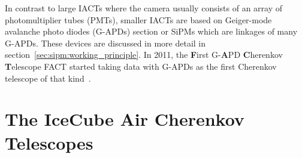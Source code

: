 In contrast to large IACTs where the camera usually consists of an array of photomultiplier tubes (PMTs), smaller IACTs are based on Geiger-mode avalanche photo diodes (G-APDs) section or SiPMs which are linkages of many G-APDs. These devices are discussed in more detail in section~\ref{sec:sipm:working_principle}. In 2011, the \textbf{F}irst G-\textbf{A}PD \textbf{C}herenkov \textbf{T}elescope FACT started taking data with G-APDs as the first Cherenkov telescope of that kind~\cite{iacts:fact}.

\section{The IceCube Air Cherenkov Telescopes \iceact}\label{sec:iceact_intro}

